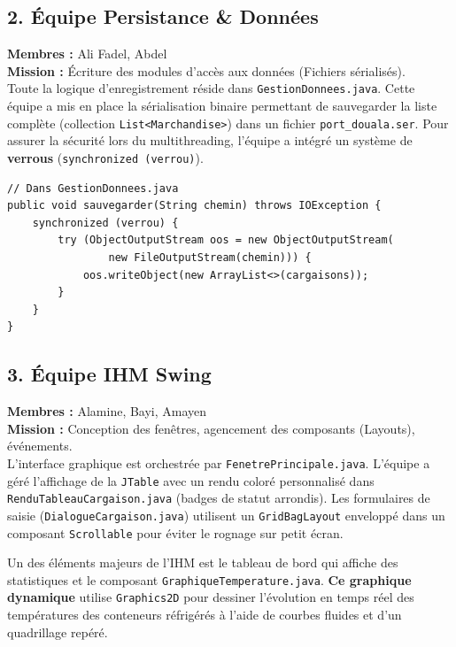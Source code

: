 \documentclass[11pt,a4paper]{article}
\begin{document}
\subsection{2. Équipe Persistance \& Données}
\textbf{Membres :} Ali Fadel, Abdel \\[0.2cm]
\textbf{Mission :} Écriture des modules d'accès aux données (Fichiers sérialisés).\\[0.2cm]
Toute la logique d'enregistrement réside dans \texttt{GestionDonnees.java}. Cette équipe a mis en place la sérialisation binaire permettant de sauvegarder la liste complète (collection \texttt{List<Marchandise>}) dans un fichier \texttt{port\_douala.ser}. Pour assurer la sécurité lors du multithreading, l'équipe a intégré un système de \textbf{verrous} (\texttt{synchronized (verrou)}).
\begin{lstlisting}
// Dans GestionDonnees.java
public void sauvegarder(String chemin) throws IOException {
    synchronized (verrou) {
        try (ObjectOutputStream oos = new ObjectOutputStream(
                new FileOutputStream(chemin))) {
            oos.writeObject(new ArrayList<>(cargaisons));
        }
    }
}
\end{lstlisting}

\subsection{3. Équipe IHM Swing}
\textbf{Membres :} Alamine, Bayi, Amayen \\[0.2cm]
\textbf{Mission :} Conception des fenêtres, agencement des composants (Layouts), événements.\\[0.2cm]
L'interface graphique est orchestrée par \texttt{FenetrePrincipale.java}. L'équipe a géré l'affichage de la \texttt{JTable} avec un rendu coloré personnalisé dans \texttt{RenduTableauCargaison.java} (badges de statut arrondis). Les formulaires de saisie (\texttt{DialogueCargaison.java}) utilisent un \texttt{GridBagLayout} enveloppé dans un composant \texttt{Scrollable} pour éviter le rognage sur petit écran.

Un des éléments majeurs de l'IHM est le tableau de bord qui affiche des statistiques et le composant \texttt{GraphiqueTemperature.java}. \textbf{Ce graphique dynamique} utilise \texttt{Graphics2D} pour dessiner l'évolution en temps réel des températures des conteneurs réfrigérés à l'aide de courbes fluides et d'un quadrillage repéré.

\end{document}
